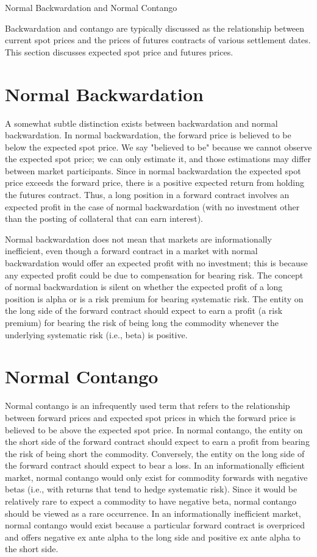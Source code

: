 \documentclass[11pt]{article}
\begin{document}
Normal Backwardation and Normal Contango

Backwardation and contango are typically discussed as the relationship between current spot prices and the prices of futures contracts of various settlement dates. This section discusses expected spot price and futures prices.

\section*{Normal Backwardation}
A somewhat subtle distinction exists between backwardation and normal backwardation. In normal backwardation, the forward price is believed to be below the expected spot price. We say "believed to be" because we cannot observe the expected spot price; we can only estimate it, and those estimations may differ between market participants. Since in normal backwardation the expected spot price exceeds the forward price, there is a positive expected return from holding the futures contract. Thus, a long position in a forward contract involves an expected profit in the case of normal backwardation (with no investment other than the posting of collateral that can earn interest).

Normal backwardation does not mean that markets are informationally inefficient, even though a forward contract in a market with normal backwardation would offer an expected profit with no investment; this is because any expected profit could be due to compensation for bearing risk. The concept of normal backwardation is silent on whether the expected profit of a long position is alpha or is a risk premium for bearing systematic risk. The entity on the long side of the forward contract should expect to earn a profit (a risk premium) for bearing the risk of being long the commodity whenever the underlying systematic risk (i.e., beta) is positive.

\section*{Normal Contango}
Normal contango is an infrequently used term that refers to the relationship between forward prices and expected spot prices in which the forward price is believed to be above the expected spot price. In normal contango, the entity on the short side of the forward contract should expect to earn a profit from bearing the risk of being short the commodity. Conversely, the entity on the long side of the forward contract should expect to bear a loss. In an informationally efficient market, normal contango would only exist for commodity forwards with negative betas (i.e., with returns that tend to hedge systematic risk). Since it would be relatively rare to expect a commodity to have negative beta, normal contango should be viewed as a rare occurrence. In an informationally inefficient market, normal contango would exist because a particular forward contract is overpriced and offers negative ex ante alpha to the long side and positive ex ante alpha to the short side.
\end{document}
